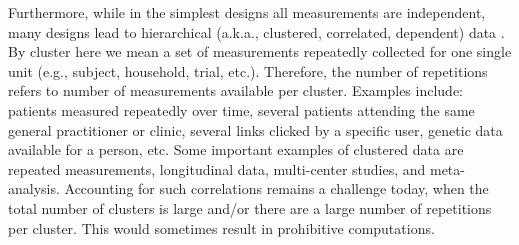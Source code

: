 \documentclass[14pt]{article}
\begin{document}
Furthermore, while in the simplest designs all measurements are independent, many designs lead to hierarchical (a.k.a., clustered, correlated, dependent) data \citep{laird1982,zeger1986,verbeke2009, molenberghs2005}. By cluster here we mean a set of measurements repeatedly collected for one single unit (e.g., subject, household, trial, etc.). Therefore, the number of repetitions refers to number of measurements available per cluster. Examples include: patients measured repeatedly over time, several patients attending the same general practitioner or clinic, several links clicked by a specific user, genetic data available for a person, etc. Some important examples of clustered data are repeated measurements, longitudinal data, multi-center studies, and meta-analysis. Accounting for such correlations remains a challenge today, when the total number of clusters is large and/or there are a large number of repetitions per cluster. This would sometimes result in prohibitive computations. 
\end{document}
